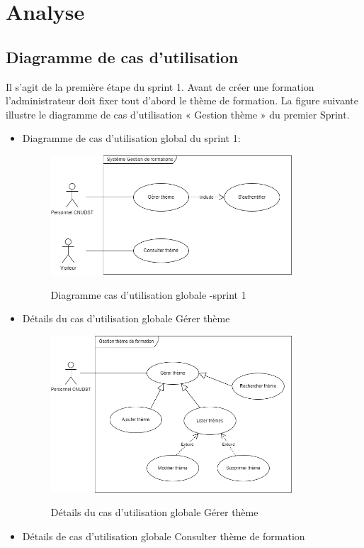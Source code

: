 \section{Analyse}
\subsection{Diagramme de cas d'utilisation}
Il s'agit de la première étape du sprint 1. Avant de créer une formation l'administrateur doit fixer tout d'abord le thème de formation.  
La figure suivante illustre le diagramme de cas d’utilisation « Gestion thème » du premier Sprint.
\newpage
\begin{itemize}
\item Diagramme de cas d'utilisation global du sprint 1:
\begin{figure}[!h]
	\centering
	{\includegraphics[width=0.85\textwidth]{D) IMAGES/globtheme.png}}
	\caption{Diagramme cas d'utilisation globale -sprint 1}
	\label{Org}
\end{figure}
\item Détails du cas d'utilisation globale Gérer thème
\begin{figure}[!h]
	\centering
	{\includegraphics[width=0.85\textwidth]{D) IMAGES/CasUtilisationsprint1.png}}
	\caption{Détails du cas d'utilisation globale Gérer thème}
	\label{Org}
\end{figure}
\newpage
\item Détails de cas d'utilisation globale Consulter thème de formation 


\end{itemize}
